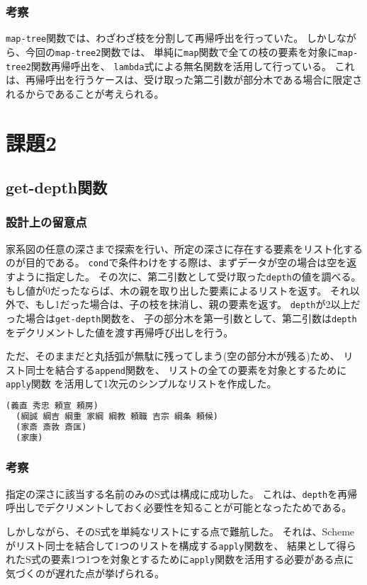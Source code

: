 \documentclass[11pt,a4paper, uplatex]{jsarticle}
\begin{document}
\subsubsection{考察}
\texttt{map-tree}関数では、わざわざ枝を分割して再帰呼出を行っていた。
しかしながら、今回の\texttt{map-tree2}関数では、
単純に\texttt{map}関数で全ての枝の要素を対象に\texttt{map-tree2}関数再帰呼出を、
\texttt{lambda}式による無名関数を活用して行っている。
これは、再帰呼出を行うケースは、受け取った第二引数が部分木である場合に限定されるからであることが考えられる。


\section{課題2}
\subsection{get-depth関数}
\subsubsection{設計上の留意点}
家系図の任意の深さまで探索を行い、所定の深さに存在する要素をリスト化するのが目的である。
\texttt{cond}で条件わけをする際は、まずデータが空の場合は空を返すように指定した。
その次に、第二引数として受け取った\texttt{depth}の値を調べる。
もし値が0だったならば、木の親を取り出した要素によるリストを返す。
それ以外で、もし1だった場合は、子の枝を抹消し、親の要素を返す。
\texttt{depth}が2以上だった場合は\texttt{get-depth}関数を、
子の部分木を第一引数として、第二引数は\texttt{depth}をデクリメントした値を渡す再帰呼び出しを行う。

ただ、そのままだと丸括弧が無駄に残ってしまう(空の部分木が残る)ため、
リスト同士を結合する\texttt{append}関数を、
リストの全ての要素を対象とするために\texttt{apply}関数
を活用して1次元のシンプルなリストを作成した。
\begin{lstlisting}[language=lisp, caption=\texttt{get-depth}関数実行例]
  (義直 秀忠 頼宣 頼房)
  (綱誠 綱吉 綱重 家綱 綱教 頼職 吉宗 綱条 頼候)
  (家斎 斎敦 斎匡)
  (家康)
\end{lstlisting}
\subsubsection{考察}
指定の深さに該当する名前のみのS式は構成に成功した。
これは、\texttt{depth}を再帰呼出しでデクリメントしておく必要性を知ることが可能となったためである。

しかしながら、そのS式を単純なリストにする点で難航した。
それは、Schemeがリスト同士を結合して1つのリストを構成する\texttt{apply}関数を、
結果として得られたS式の要素1つ1つを対象とするために\texttt{apply}関数を活用する必要がある点に
気づくのが遅れた点が挙げられる。
\end{document}

